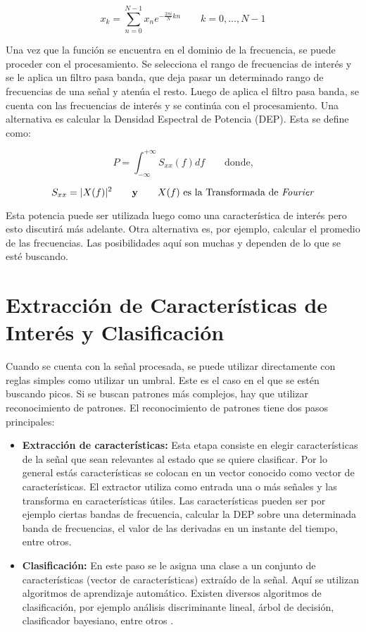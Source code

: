 $$ x_{k} = \sum_{n=0}^{N-1} x_{n}e^{-\frac{2 \pi i}{N}kn} \qquad k = 0,\hdots, N - 1 $$

Una vez que la función se encuentra en el dominio de la frecuencia, se puede proceder con el procesamiento. Se selecciona el rango de frecuencias de interés y se le aplica un filtro pasa banda, que deja pasar un determinado rango de frecuencias de una señal y atenúa el resto. Luego de aplica el filtro pasa banda,  se cuenta con las frecuencias de interés y se continúa con el procesamiento. Una alternativa es calcular la Densidad Espectral de Potencia (DEP). Esta se define como:

$$ P = \int_{-\infty}^{+\infty} S_{xx} (f) df \qquad  \textrm{donde,}$$

$$ S_{xx} = |X(f)|^{2} \qquad \textbf{y} \qquad X(f) \textrm{ es la Transformada de \emph{Fourier}} $$

Esta potencia puede ser utilizada luego como una característica de interés pero esto discutirá más adelante. Otra alternativa  es, por ejemplo, calcular el promedio de las frecuencias. Las posibilidades aquí son muchas y dependen de lo que se esté buscando.

\section{Extracción de Características de Interés y Clasificación}

Cuando se cuenta con la señal procesada, se puede utilizar directamente con reglas simples como utilizar un umbral. Este es el caso en el que se estén buscando picos. Si se buscan patrones más complejos, hay que utilizar reconocimiento de patrones. El reconocimiento de patrones tiene dos pasos principales:

\begin{itemize}
  \item \textbf{Extracción de características:} Esta etapa consiste en elegir características de la señal que sean relevantes al estado que se quiere clasificar. Por lo general estás características se colocan en un vector conocido como vector de características. El extractor utiliza como entrada una o más señales y las transforma en características útiles. Las características pueden ser por ejemplo ciertas bandas de frecuencia, calcular la DEP sobre una determinada banda de frecuencias, el valor de las derivadas en un instante del tiempo, entre otros. 
  \item \textbf{Clasificación:} En este paso se le asigna una clase a un conjunto de características (vector de características) extraído de la señal. Aquí se utilizan algoritmos de aprendizaje automático. Existen diversos algoritmos de clasificación, por ejemplo análisis discriminante lineal, árbol de decisión, clasificador bayesiano, entre otros \cite{eeg-tutorial}.
\end{itemize}

